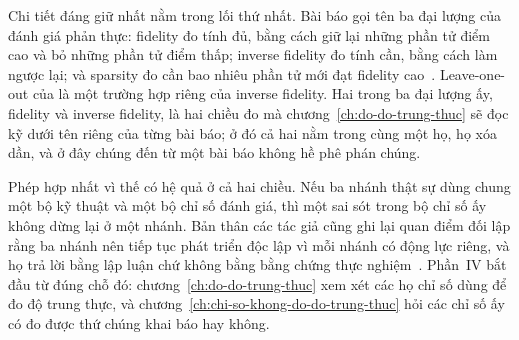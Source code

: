 Chi tiết đáng giữ nhất nằm trong lối thứ nhất. Bài báo gọi tên ba đại lượng của
đánh giá phản thực: fidelity đo tính đủ, bằng cách giữ lại những phần tử điểm
cao và bỏ những phần tử điểm thấp; inverse fidelity đo tính cần, bằng cách làm
ngược lại; và sparsity đo cần bao nhiêu phần tử mới đạt fidelity
cao~\autocite{p18unified}. Leave-one-out của
 là một trường hợp riêng của inverse
fidelity. Hai trong ba đại lượng ấy, fidelity và inverse fidelity, là hai chiều
đo mà chương~\ref{ch:do-do-trung-thuc} sẽ đọc kỹ dưới tên riêng của từng bài
báo; ở đó cả hai nằm trong cùng một họ, họ xóa dần, và ở đây chúng đến từ một
bài báo không hề phê phán chúng.

Phép hợp nhất vì thế có hệ quả ở cả hai chiều. Nếu ba nhánh
thật sự dùng chung một bộ kỹ
thuật và một bộ chỉ số đánh giá, thì một sai sót trong bộ chỉ số ấy không dừng
lại ở một nhánh. Bản thân các tác giả cũng ghi lại quan điểm đối lập rằng ba
nhánh nên tiếp tục phát triển độc lập vì mỗi nhánh có động lực riêng, và họ trả
lời bằng lập luận chứ không bằng bằng chứng thực nghiệm~\autocite{p18unified}.
Phần~IV bắt đầu từ đúng chỗ đó: chương~\ref{ch:do-do-trung-thuc} xem xét các họ
chỉ số dùng để đo độ trung thực, và chương~\ref{ch:chi-so-khong-do-do-trung-thuc}
hỏi các chỉ số ấy có đo được thứ chúng khai báo hay không.
